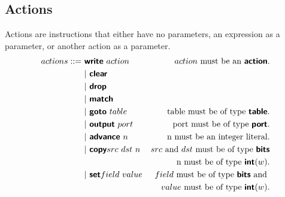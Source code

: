 \subsection{Actions}

Actions are instructions that either have no parameters, an expression as a parameter, or another action as a parameter.
\begin{align*}
actions::=~&  \bm{\mathsf{{write}}} \ action     & action \text{ must be an } \bm{\mathsf{{action}}}.\\
  & | \ \bm{\mathsf{{clear}}}\\
  & | \ \bm{\mathsf{{drop}}}\\
  & | \ \bm{\mathsf{{match}}}\\
  & | \ \bm{\mathsf{{goto}}} \ table             & \text{table must be of type } \bm{\mathsf{{table}}}.\\
  & | \ \bm{\mathsf{{output}}} \ port            & \text{port must be of type } \bm{\mathsf{{port}}}.\\
  & | \ \bm{\mathsf{{advance}}} \ n              & \text{n must be an integer literal.}\\
  & | \ \bm{\mathsf{{copy}}} src \ dst \ n       & src \text{ and } dst \text{ must be of type } \bm{\mathsf{{bits}}} \\
                                         && \text{n must be of type } \bm{\mathsf{{int}}}(w).\\
  & | \ \bm{\mathsf{{set}}} field \ value        & field \text{ must be of type } \bm{\mathsf{{bits}}} \text{ and }\\
                                         && value \text{ must be of type } \bm{\mathsf{{int}}}(w).
\end{align*}
